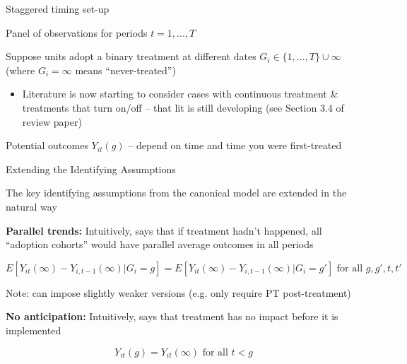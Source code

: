 \documentclass[aspectratio = 169, 13pt]{beamer}
\begin{document}
\begin{frame}{Staggered timing set-up}
  \begin{wideitemize}
	\item
	Panel of observations for periods $t = 1,...,T$

    \item
    Suppose units adopt a binary treatment at different dates $G_i \in \{1,...,T \} \cup \infty$ (where $G_i = \infty$ means ``never-treated'')
    \begin{itemize}
      \item
            Literature is now starting to consider cases with continuous treatment \& treatments that turn on/off -- that lit is still developing (see Section 3.4 of review paper)
    \end{itemize}

    \item
    Potential outcomes $Y_{it}(g)$ -- depend on time and time you were first-treated

  \end{wideitemize}
\end{frame}


\begin{frame}{Extending the Identifying Assumptions}
  \begin{wideitemize}
    \item
    The key identifying assumptions from the canonical model are extended in the natural way

    \item
    \textbf{Parallel trends:} Intuitively, says that if treatment hadn't happened, all ``adoption cohorts'' would have parallel average outcomes in all periods

    $$ E[ Y_{it}(\infty) - Y_{i,t-1}(\infty) | G_i = g ] = E[ Y_{it}(\infty) - Y_{i,t-1}(\infty) | G_i = g' ] \text{ for all } g,g',t,t' $$


    Note: can impose slightly weaker versions (e.g. only require PT post-treatment)

    \item
    \textbf{No anticipation:} Intuitively, says that treatment has no impact before it is implemented

    $$Y_{it}(g) = Y_{it}(\infty) \text{ for all } t<g$$
  \end{wideitemize}
\end{frame}
\end{document}

